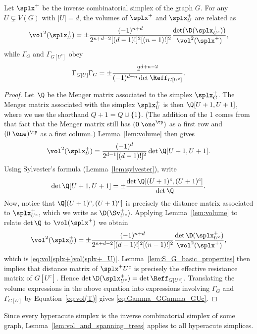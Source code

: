 \begin{lemma}
	\label{lem:vol_and_spanning_trees}
	Let $\splx^+$ be the inverse combinatorial simplex of the graph $G$.
	For any $U\subsetneq  V(G)$ with $|U|=d$,  the volumes of $\splx^+$ and $\splx^+_{U}$ are related  as 
	\begin{equation}
	\label{eq:vol(splx+)vol(splx+_U)}
	\vol^2(\splx^+_U) = \pm \frac{(-1)^{n+d}}{2^{n+d-2} [(d-1)!]^2[(n-1)!]^2 } \frac{\det(\D(\splx^+_{U^c}))}{\vol^2(\splx^+)},
	\end{equation} 
	while $\Gamma_{G}$ and $\Gamma_{G[U^c]}$ obey
	\begin{equation}
	\label{eq:Gamma_GGamma_GUc}
	\Gamma_{G[U]}\Gamma_G = \pm  \frac{2^{d+n-2}}{(-1)^{d+n}\det\Reff_{G[U^c]}}.
	\end{equation}
\end{lemma}
\begin{proof}
	Let $\Q$  be the Menger matrix associated to the simplex $\splx_G^+$. The Menger matrix associated with the simplex $\splx^+_U$ is then  $\Q[U+1,U+1]$, where we use the shorthand $Q+1=Q\cup\{1\}$. (The addition of the 1 comes from that fact that the Menger matrix still has $(0 \;\one^\tp)$ as a first row and $(0\; \one)^\tp$ as a first column.) 
	Lemma~\ref{lem:volume} then gives 
	\[\vol^2(\splx^+_{U}) = \frac{(-1)^d}{2^{d-1} [(d-1)!]^2 } \det\Q[U+1,U+1].\] 
	Using Sylvester's formula (Lemma~\ref{lem:sylvester}), write 
	\[\det\Q[U+1,U+1] = \pm \frac{\det\Q[(U+1)^c,(U+1)^c]}{\det\Q}.\]
	Now, notice that $\Q[(U+1)^c,(U+1)^c]$ is precisely the distance matrix associated to $\splx_{U^c}^+$, which we write as $\D(\Sv^+_{U^c})$.  Applying Lemma~\ref{lem:volume} to relate $\det\Q$ to $\vol(\splx^+)$ we obtain 
	\begin{equation*}
	\vol^2(\splx^+_U) = \pm \frac{(-1)^{n+d}}{2^{n+d-2} [(d-1)!]^2[(n-1)!]^2 } \frac{\det\D(\splx^+_{U^c})}{\vol^2(\splx^+)},
	\end{equation*} 
	which is \eqref{eq:vol(splx+)vol(splx+_U)}.
	Lemma~\ref{lem:S_G_basic_properties} then implies that distance matrix of $\splx^+{U^c}$ is precisely the  effective resistance matrix of $G[U^c]$. Hence  $\det\D(\splx^+_{U^c})=\det\Reff_{G[U^c]}$. Translating the volume expressions in the above equation into expressions involving $\Gamma_G$ and $\Gamma_{G[U]}$ by Equation~\ref{eq:vol(T)} gives \eqref{eq:Gamma_GGamma_GUc}.  
\end{proof}

\begin{remark}
	Since every hyperacute simplex is  the inverse combinatorial simplex of  some graph, Lemma~\ref{lem:vol_and_spanning_trees} applies to  all hyperacute simplices. 
\end{remark}

